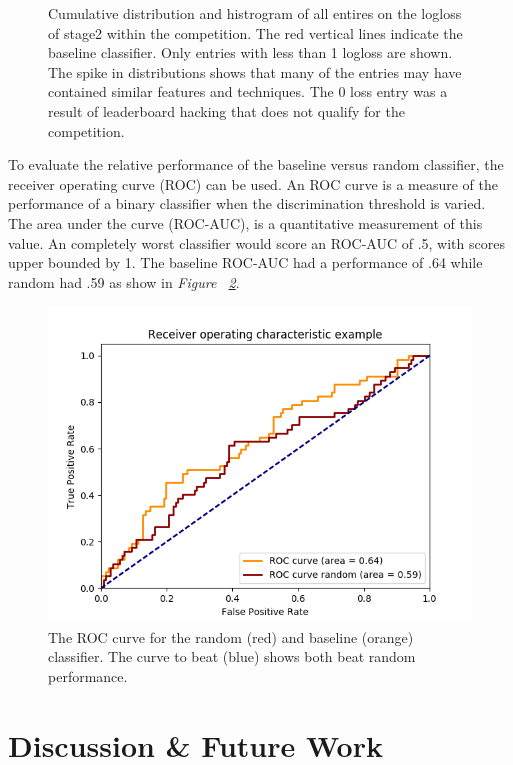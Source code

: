 \documentclass[conference,11pt]{IEEEtran}
\begin{document}
\begin{figure}[htb]
\begin{minipage}[c]{0.4\textwidth}
  \end{minipage}
  \caption{Cumulative distribution and histrogram of all entires on the logloss of stage2 within the competition. The red vertical lines indicate the baseline classifier. Only entries with less than 1 logloss are shown. The spike in distributions shows that many of the entries may have contained similar features and techniques. The 0 loss entry was a result of leaderboard hacking that does not qualify for the competition.}
  \label{fig:leaderboard}
\end{figure}

To evaluate the relative performance of the baseline versus random classifier, the receiver operating curve (ROC) can be used. An ROC curve is a measure of the performance of a binary classifier when the discrimination threshold is varied. The area under the curve (ROC-AUC), is a quantitative measurement of this value. An completely worst classifier would score an ROC-AUC of .5, with scores upper bounded by 1. The baseline ROC-AUC had a performance of .64 while random had .59 as show in \textit{Figure ~\ref{fig:roc}}.

\begin{figure}
    \centering
    \includegraphics[width=0.8\linewidth]{figures/plot_roc_curves.png}
    \caption{The ROC curve for the random (red) and baseline (orange) classifier. The curve to beat (blue) shows both beat random performance.}
    \label{fig:roc}
\end{figure}

\section{Discussion \& Future Work}
\end{document}
